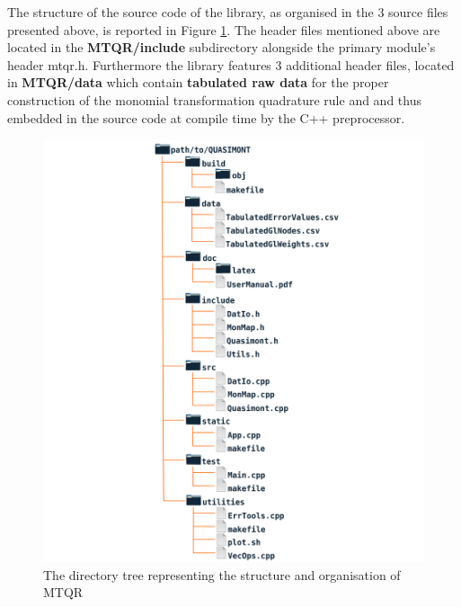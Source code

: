 \documentclass[a4paper, twosided]{book}
\begin{document}
\noindent
The structure of the source code of the library, as organised in the $3$ source files presented above, is reported in Figure \ref{Fig2.1}. The header files mentioned above are located in the \colorbox{poliGrayBlue}{\textbf{MTQR/include}} subdirectory alongside the primary module's header \colorbox{poliGrayBlue}{mtqr.h}. Furthermore the library features $3$ additional header files, located in \colorbox{poliGrayBlue}{\textbf{MTQR/data}} which contain \color{poliDarkBlue} \textbf{tabulated raw data} \color{black} for the proper construction of the monomial transformation quadrature rule and and thus embedded in the source code at compile time by the C++ preprocessor.

\begin{center}
        \begin{figure}[H]
        \centering
        \includegraphics[keepaspectratio, width=.6\textwidth]{images/DirectoryStructureCentered.png}
        \caption{The directory tree representing the structure and organisation of MTQR}
        \label{Fig2.1}
        \end{figure}
\end{center}
\end{document}
